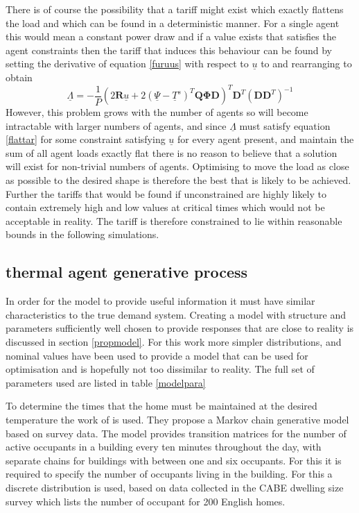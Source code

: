 \documentclass[a4paper, 10 pt, conference]{ieeeconf}  %
\begin{document}
There is of course the possibility that a tariff might exist which exactly flattens the load and which can be found in a deterministic manner. For a single agent this would mean a constant power draw and if a value exists that satisfies the agent constraints then the tariff that induces this behaviour can be found by setting the derivative of equation \ref{furuus} with respect to $\underline{u}$ to and rearranging to obtain
\begin{equation}
\label{flattar}
\underline{\Lambda} = -\frac{1}{P}\left( 2\mathbf{R}\underline{u} + 2(\underline{\Psi}-\underline{T}^s)^{T}\mathbf{Q}\boldsymbol{\Phi}\mathbf{D}\right)^{T}\mathbf{D}^T(\mathbf{DD}^{T})^{-1}
\end{equation}
However, this problem grows with the number of agents so will become intractable with larger numbers of agents, and since $\underline{\Lambda}$ must satisfy equation \ref{flattar} for some constraint satisfying $\underline{u}$ for every agent present, and maintain the sum of all agent loads exactly flat there is no reason to believe that a solution will exist for non-trivial numbers of agents. Optimising to move the load as close as possible to the desired shape is therefore the best that is likely to be achieved. Further the tariffs that would be found if unconstrained are highly likely to contain extremely high and low values at critical times which would not be acceptable in reality. The tariff is therefore constrained to lie within reasonable bounds in the following simulations.
\subsection{thermal agent generative process}
In order for the model to provide useful information it must have similar characteristics to the true demand system. Creating a model with structure and parameters sufficiently well chosen to provide responses that are close to reality is discussed in section \ref{propmodel}. For this work more simpler distributions, and nominal values have been used to provide a model that can be used for optimisation and is hopefully not too dissimilar to reality. The full set of parameters used are listed in table \ref{modelpara}

To determine the times that the home must be maintained at the desired temperature the work of \cite{richardson2008high} is used. They propose a Markov chain generative model based on survey data. The model provides transition matrices for the number of active occupants in a building every ten minutes throughout the day, with separate chains for buildings with between one and six occupants. For this it is required to specify the number of occupants living in the building. For this a discrete distribution is used, based on data collected in the CABE dwelling size survey \cite{CABE} which lists the number of occupant for 200 English homes.
\end{document}
